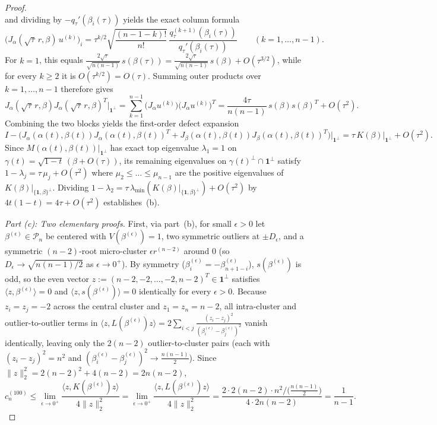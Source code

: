 \documentclass[11pt,a4paper]{article}
\theoremstyle{definition}
\newcommand{\one}{\mathbf{1}}
\begin{document}
\begin{proof}
\[\]
and dividing by $-q_\tau'(\beta_i(\tau))$ yields the exact column formula
\[
\big(J_\alpha(\sqrt{\tau}\,r, \beta)\, u^{(k)}\big)_i = \tau^{k/2}\sqrt{\frac{(n-1-k)!}{n!}}\,\frac{q_\tau^{(k+1)}(\beta_i(\tau))}{q_\tau'(\beta_i(\tau))} \qquad (k = 1, \dots, n-1).
\]
For $k = 1$, this equals $\frac{2\sqrt{\tau}}{\sqrt{n(n-1)}}\, s(\beta(\tau)) = \frac{2\sqrt{\tau}}{\sqrt{n(n-1)}}\, s(\beta) + O(\tau^{3/2})$, while for every $k \ge 2$ it is $O(\tau^{k/2}) = O(\tau)$. Summing outer products over $k = 1, \dots, n-1$ therefore gives
\[
J_\alpha(\sqrt{\tau}\,r, \beta) J_\alpha(\sqrt{\tau}\,r, \beta)^T\big|_{\one^\perp}
= \sum_{k=1}^{n-1} \big(J_\alpha u^{(k)}\big)\big(J_\alpha u^{(k)}\big)^T
= \frac{4\tau}{n(n-1)}\, s(\beta) s(\beta)^T + O(\tau^2).
\]
Combining the two blocks yields the first-order defect expansion
\[
I - \big(J_\alpha(\alpha(t), \beta(t)) J_\alpha(\alpha(t), \beta(t))^T + J_\beta(\alpha(t), \beta(t)) J_\beta(\alpha(t), \beta(t))^T\big)\Big|_{\one^\perp}
= \tau\, K(\beta)\big|_{\one^\perp} + O(\tau^2).
\]
Since $M(\alpha(t), \beta(t))|_{\one^\perp}$ has exact top eigenvalue $\lambda_1 = 1$ on $\gamma(t) = \sqrt{1-t}\,(\beta + O(\tau))$, its remaining eigenvalues on $\gamma(t)^\perp \cap \one^\perp$ satisfy $1 - \lambda_j = \tau\,\mu_j + O(\tau^2)$ where $\mu_2 \le \dots \le \mu_{n-1}$ are the positive eigenvalues of $K(\beta)|_{\{\one,\beta\}^\perp}$. Dividing $1 - \lambda_2 = \tau\,\lambda_{\min}(K(\beta)|_{\{\one,\beta\}^\perp}) + O(\tau^2)$ by $4t(1-t) = 4\tau + O(\tau^2)$ establishes~(b).

\emph{Part (c): Two elementary proofs.}
First, via part~(b), for small $\epsilon > 0$ let $\beta^{(\epsilon)} \in \mathcal{P}_n$ be centered with $V(\beta^{(\epsilon)}) = 1$, two symmetric outliers at $\pm D_\epsilon$, and a symmetric $(n-2)$-root micro-cluster $\epsilon r^{(n-2)}$ around $0$ (so $D_\epsilon \to \sqrt{n(n-1)/2}$ as $\epsilon \to 0^+$). By symmetry ($\beta^{(\epsilon)}_i = -\beta^{(\epsilon)}_{n+1-i}$), $s(\beta^{(\epsilon)})$ is odd, so the even vector $z := (n-2, -2, \dots, -2, n-2)^T \in \one^\perp$ satisfies $\langle z, \beta^{(\epsilon)}\rangle = 0$ and $\langle z, s(\beta^{(\epsilon)})\rangle = 0$ identically for every $\epsilon > 0$. Because $z_i = z_j = -2$ across the central cluster and $z_1 = z_n = n-2$, all intra-cluster and outlier-to-outlier terms in $\langle z, L(\beta^{(\epsilon)}) z\rangle = 2\sum_{i < j} \frac{(z_i - z_j)^2}{(\beta^{(\epsilon)}_i - \beta^{(\epsilon)}_j)^2}$ vanish identically, leaving only the $2(n-2)$ outlier-to-cluster pairs (each with $(z_i - z_j)^2 = n^2$ and $(\beta^{(\epsilon)}_i - \beta^{(\epsilon)}_j)^2 \to \frac{n(n-1)}{2}$). Since $\|z\|_2^2 = 2(n-2)^2 + 4(n-2) = 2n(n-2)$,
\[
c_n^{(100)}
\le \lim_{\epsilon \to 0^+} \frac{\langle z, K(\beta^{(\epsilon)}) z\rangle}{4\|z\|_2^2}
= \lim_{\epsilon \to 0^+} \frac{\langle z, L(\beta^{(\epsilon)}) z\rangle}{4\|z\|_2^2}
= \frac{2 \cdot 2(n-2) \cdot n^2 / \bigl(\frac{n(n-1)}{2}\bigr)}{4 \cdot 2n(n-2)}
= \frac{1}{n - 1}.
\]


\end{proof}
\end{document}
